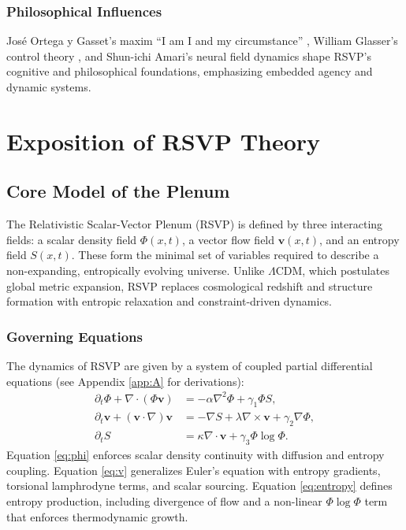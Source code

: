\documentclass[12pt]{report}
\begin{document}
\section{Philosophical Influences}
José Ortega y Gasset’s maxim “I am I and my circumstance” \citep{Ortega1914}, William Glasser’s control theory \citep{Glasser1985}, and Shun-ichi Amari’s neural field dynamics \citep{Amari1977} shape RSVP’s cognitive and philosophical foundations, emphasizing embedded agency and dynamic systems.

\part{Exposition of RSVP Theory}

\chapter{Core Model of the Plenum}
The Relativistic Scalar-Vector Plenum (RSVP) is defined by three interacting fields: a scalar density field \(\Phi(x,t)\), a vector flow field \(\mathbf{v}(x,t)\), and an entropy field \(S(x,t)\). These form the minimal set of variables required to describe a non-expanding, entropically evolving universe. Unlike \(\Lambda\)CDM, which postulates global metric expansion, RSVP replaces cosmological redshift and structure formation with entropic relaxation and constraint-driven dynamics.

\section{Governing Equations}
The dynamics of RSVP are given by a system of coupled partial differential equations (see Appendix \ref{app:A} for derivations):
\begin{align}
\partial_t \Phi + \nabla \cdot (\Phi \mathbf{v}) &= -\alpha \nabla^2 \Phi + \gamma_1 \Phi S, \label{eq:phi} \\
\partial_t \mathbf{v} + (\mathbf{v}\cdot\nabla)\mathbf{v} &= -\nabla S + \lambda \nabla \times \mathbf{v} + \gamma_2 \nabla \Phi, \label{eq:v} \\
\partial_t S &= \kappa \nabla \cdot \mathbf{v} + \gamma_3 \Phi \log \Phi. \label{eq:entropy}
\end{align}
Equation \eqref{eq:phi} enforces scalar density continuity with diffusion and entropy coupling. Equation \eqref{eq:v} generalizes Euler’s equation with entropy gradients, torsional lamphrodyne terms, and scalar sourcing. Equation \eqref{eq:entropy} defines entropy production, including divergence of flow and a non-linear \(\Phi \log \Phi\) term that enforces thermodynamic growth.
\end{document}
